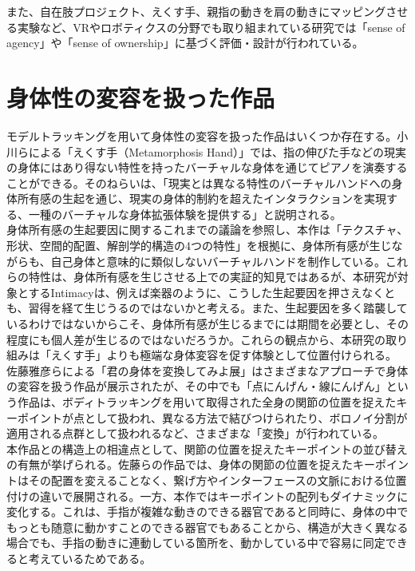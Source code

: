 また、自在肢プロジェクト、えくす手、親指の動きを肩の動きにマッピングさせる実験など、VRやロボティクスの分野でも取り組まれている研究では「sense of agency」や「sense of ownership」に基づく評価・設計が行われている。



\section{身体性の変容を扱った作品}
モデルトラッキングを用いて身体性の変容を扱った作品はいくつか存在する。小川らによる「えくす手（Metamorphosis Hand）」\cite{ekusute}では、指の伸びた手などの現実の身体にはあり得ない特性を持ったバーチャルな身体を通じてピアノを演奏することができる。そのねらいは、「現実とは異なる特性のバーチャルハンドへの身体所有感の生起を通じ、現実の身体的制約を超えたインタラクションを実現する、一種のバーチャルな身体拡張体験を提供する」と説明される。\\
身体所有感の生起要因に関するこれまでの議論を参照し、本作は「テクスチャ、形状、空間的配置、解剖学的構造の4つの特性」を根拠に、身体所有感が生じながらも、自己身体と意味的に類似しないバーチャルハンドを制作している。これらの特性は、身体所有感を生じさせる上での実証的知見ではあるが、本研究が対象とするIntimacyは、例えば楽器のように、こうした生起要因を押さえなくとも、習得を経て生じうるのではないかと考える。また、生起要因を多く踏襲しているわけではないからこそ、身体所有感が生じるまでには期間を必要とし、その程度にも個人差が生じるのではないだろうか。これらの観点から、本研究の取り組みは「えくす手」よりも極端な身体変容を促す体験として位置付けられる。\\
佐藤雅彦らによる「君の身体を変換してみよ展」はさまざまなアプローチで身体の変容を扱う作品が展示されたが、その中でも「点にんげん・線にんげん」という作品は、ボディトラッキングを用いて取得された全身の関節の位置を捉えたキーポイントが点として扱われ、異なる方法で結びつけられたり、ボロノイ分割が適用される点群として扱われるなど、さまざまな「変換」が行われている。\\
本作品との構造上の相違点として、関節の位置を捉えたキーポイントの並び替えの有無が挙げられる。佐藤らの作品では、身体の関節の位置を捉えたキーポイントはその配置を変えることなく、繋げ方やインターフェースの文脈における位置付けの違いで展開される。一方、本作ではキーポイントの配列もダイナミックに変化する。これは、手指が複雑な動きのできる器官であると同時に、身体の中でもっとも随意に動かすことのできる器官でもあることから、構造が大きく異なる場合でも、手指の動きに連動している箇所を、動かしている中で容易に同定できると考えているためである。

